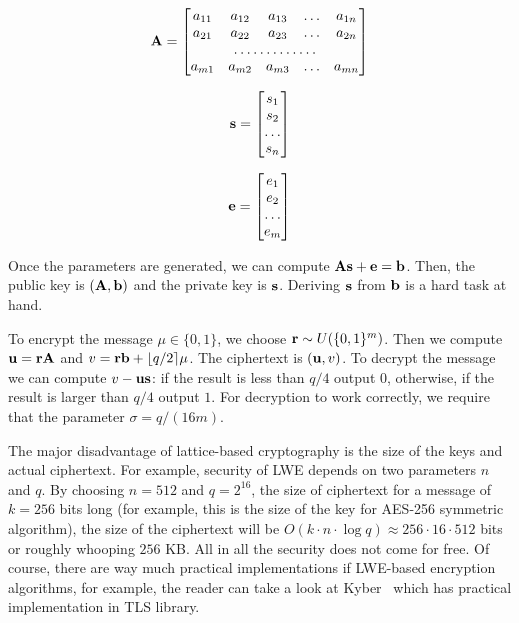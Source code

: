 \begin{equation}
    {\bf A}=\begin{bmatrix}
        a_{11}       & a_{12} & a_{13} & \dots & a_{1n} \\
        a_{21}       & a_{22} & a_{23} & \dots & a_{2n} \\
        \hdotsfor{5} \\
        a_{m1}       & a_{m2} & a_{m3} & \dots & a_{mn}
    \end{bmatrix}
\end{equation}

\begin{equation}
    {\bf s}=\begin{bmatrix}
        s_{1} \\
        s_{2} \\
        \dots \\
        s_{n} 
    \end{bmatrix}
\end{equation}

\begin{equation}
    {\bf e}=\begin{bmatrix}
        e_{1} \\
        e_{2} \\
        \dots \\
        e_{m} 
    \end{bmatrix}
\end{equation}

Once the parameters are generated, we can compute ${\bf As}+{\bf e} = {\bf b}$. Then, the public 
key is $({\bf A, b})$ and the private key is ${\bf s}$. Deriving ${\bf s}$ from ${\bf b}$ is a hard 
task at hand.

To encrypt the message $\mu \in \{0, 1\}$, we choose ${\bf r} \sim U(\{0, 1\}^m)$. Then we compute ${\bf u}={\bf rA}$ and 
$v={\bf rb}+\lfloor q/2 \rceil \mu$. The ciphertext is $({\bf u}, v)$. To decrypt the message we can 
compute $v - \bf{u s}$: if the result is less than $q/4$ output $0$, otherwise, if the result
is larger than $q/4$ output $1$. For decryption to work correctly, we require that the parameter $\sigma = q/(16m)$. 

The major disadvantage of lattice-based cryptography is the size of the keys and actual ciphertext. For example,
security of LWE depends on two parameters $n$ and $q$. By choosing $n=512$ and $q=2^{16}$, the size of ciphertext
for a message of $k=256$ bits long (for example, this is the size of the key for AES-256 symmetric algorithm), 
the size of the ciphertext will be $O(k \cdot n \cdot \log q) \approx 256 \cdot 16 \cdot 512$ bits or roughly whooping 
$256$ KB. All in all the security does not come for free. Of course, there are way much practical implementations
if LWE-based encryption algorithms, for example, the reader can take a look at Kyber~\cite{nist:kyber} which has practical 
implementation in TLS library.

